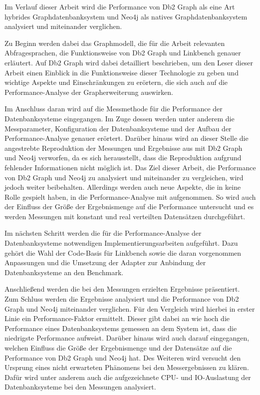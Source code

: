 Im Verlauf dieser Arbeit wird die Performance von Db2 Graph als eine Art hybrides Graphdatenbanksystem und Neo4j als natives Graphdatenbanksystem analysiert und miteinander verglichen. 

Zu Beginn werden dabei das Graphmodell, die für die Arbeit relevanten Abfragesprachen, die Funktionsweise von Db2 Graph und Linkbench genauer erläutert. Auf Db2 Graph wird dabei detailliert beschrieben, um den Leser dieser Arbeit einen Einblick in die Funktionsweise dieser Technologie zu geben und wichtige Aspekte und Einschränkungen zu erörtern, die sich auch auf die Performance-Analyse der Grapherweiterung auswirken.  

Im Anschluss daran wird auf die Messmethode für die Performance der Datenbanksysteme eingegangen. Im Zuge dessen werden unter anderem die Messparameter, Konfiguration der Datenbanksysteme und der Aufbau der Performance-Analyse genauer erörtert. Darüber hinaus wird an dieser Stelle die angestrebte Reproduktion der Messungen und Ergebnisse aus \cite{sigmod_tian} mit Db2 Graph und Neo4j verworfen, da es sich herausstellt, dass die Reproduktion aufgrund fehlender Informationen nicht möglich ist. Das Ziel dieser Arbeit, die Performance von Db2 Graph und Neo4j zu analysiert und miteinander zu vergleichen, wird jedoch weiter beibehalten. Allerdings werden auch neue Aspekte, die in \cite{sigmod_tian} keine Rolle gespielt haben, in die Performance-Analyse mit aufgenommen. So wird auch der Einfluss der Größe der Ergebnismenge auf die Performance untersucht und es werden Messungen mit konstant und real verteilten Datensätzen durchgeführt.  

Im nächsten Schritt werden die für die Performance-Analyse der Datenbanksysteme notwendigen Implementierungsarbeiten aufgeführt. Dazu gehört die Wahl der Code-Basis für Linkbench sowie die daran vorgenommen Anpassungen und die Umsetzung der Adapter zur Anbindung der Datenbanksysteme an den Benchmark. 

Anschließend werden die bei den Messungen erzielten Ergebnisse präsentiert. Zum Schluss werden die Ergebnisse analysiert und die Performance von Db2 Graph und Neo4j miteinander verglichen. Für den Vergleich wird hierbei in erster Linie ein Performance-Faktor ermittelt. Dieser gibt dabei an wie hoch die Performance eines Datenbanksystems gemessen an dem System ist, dass die niedrigste Performance aufweist. Darüber hinaus wird auch darauf eingegangen, welchen Einfluss die Größe der Ergebnismenge und der Datensätze auf die Performance von Db2 Graph und Neo4j hat. Des Weiteren wird versucht den Ursprung eines nicht erwarteten Phänomens bei den Messergebnissen zu klären. Dafür wird unter anderem auch die aufgezeichnete CPU- und IO-Auslastung der Datenbanksysteme bei den Messungen analysiert.